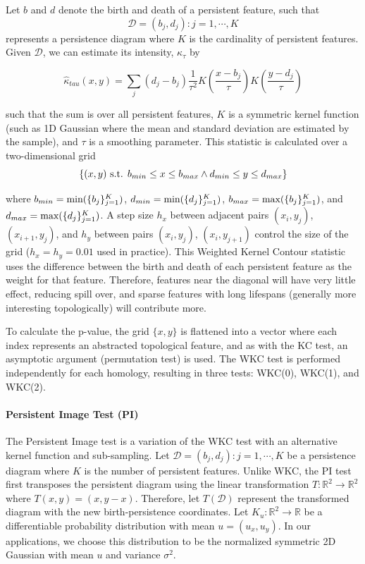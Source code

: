 \documentclass[12pt]{article}
\begin{document}
Let $b$ and $d$ denote the birth and death of a persistent feature, such that \[ \mathcal{D} = {(b_{j} , d_{j}) : j = 1, \cdots ,K} \] represents a persistence diagram where $K$ is the cardinality of persistent features. Given $\mathcal{D}$, we can estimate its intensity, $\kappa_{\tau}$ by

\[ \hat{\kappa}_{tau}(x,y) = \sum_{j}(d_{j} - b_{j})\frac{1}{\tau^{2}}K(\frac{x-b_{j}}{\tau})K(\frac{y-d_{j}}{\tau})\]

such that the sum is over all persistent features, $K$ is a symmetric kernel function (such as 1D Gaussian where the mean and standard deviation are estimated by the sample), and $\tau$ is a smoothing parameter. This statistic is calculated over a two-dimensional grid 
\[ \{ (x, y) \textup{ s.t. } b_{min} \leq x \leq b_{max} \wedge d_{min} \leq y \leq d_{max} \} \]

where $b_{min} = \textup{min}(\{b_{j}\}^{K}_{j=1})$, $d_{min} = \textup{min}(\{d_{j}\}^{K}_{j=1})$, $b_{max} = \textup{max}(\{b_{j}\}^{K}_{j=1})$, and $d_{max} = \textup{max}(\{d_{j}\}^{K}_{j=1})$. A step size $h_{x}$ between adjacent pairs $(x_{i}, y_{j})$, $(x_{i+1}, y_{j})$, and $h_{y}$ between pairs $(x_{i}, y_{j})$, $(x_{i}, y_{j+1})$ control the size of the grid ($h_{x} = h_{y} = 0.01$ used in practice). This Weighted Kernel Contour statistic \cite{chen2015statistical} uses the difference between the birth and death of each persistent feature as the weight for that feature. Therefore, features near the diagonal will have very little effect, reducing spill over, and sparse features with long lifespans (generally more interesting topologically) will contribute more. 

To calculate the p-value, the grid $\{x, y\}$ is flattened into a vector where each index represents an abstracted topological feature, and as with the KC test, an asymptotic argument (permutation test) is used. The WKC test is performed independently for each homology, resulting in three tests: WKC(0), WKC(1), and WKC(2).

\paragraph{Persistent Image Test (PI)} The Persistent Image test \cite{adams2015persistent} is a variation of the WKC test with an alternative kernel function and sub-sampling. Let $\mathcal{D} = {(b_{j} , d_{j}) : j = 1, \cdots ,K}$ be a persistence diagram where $K$ is the number of persistent features. Unlike WKC, the PI test first transposes the persistent diagram using the linear transformation $T: \mathbb{R}^{2} \rightarrow \mathbb{R}^{2}$ where $T(x,y) = (x, y-x)$. Therefore, let $T(\mathcal{D})$ represent the transformed diagram with the new birth-persistence coordinates. Let $K_{u} : \mathbb{R}^{2} \rightarrow \mathbb{R}$ be a differentiable probability distribution with mean $u = (u_{x}, u_{y})$. In our applications, we choose this distribution to be the normalized symmetric 2D Gaussian with mean $u$ and variance $\sigma^{2}$. 
\end{document}
